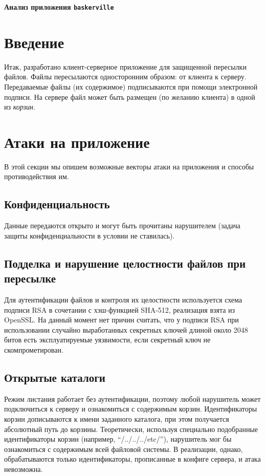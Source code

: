 \documentclass[a4paper,12pt]{article}
\begin{document}
\large
\sffamily
\thispagestyle{fancy}

\begin{center}\LARGE\renewcommand{\baselinestretch}{.9}
\textbf{Анализ приложения {\tt baskerville}}\\
\end{center}

\section*{Введение}

Итак, разработано клиент-серверное приложение для защищенной пересылки файлов.
Файлы пересылаются односторонним образом: от клиента к серверу. Передаваемые файлы (их содержимое)
подписываются при помощи электронной подписи.
На сервере файл может быть размещен (по желанию клиента) в одной из \emph{корзин}.

\section{Атаки на приложение}

В этой секции мы опишем возможные векторы атаки на приложения и способы противодействия им.

\subsection{Конфиденциальность}

Данные передаются открыто и могут быть прочитаны нарушителем (задача защиты конфиденциальности в условии не ставилась).

\subsection{Подделка и нарушение целостности файлов при пересылке}

Для аутентификации файлов и контроля их целостности используется схема подписи RSA в сочетании с хэш-функцией SHA-512, реализация взята 
из OpenSSL. На данный момент нет причин считать, что у подписи RSA при использовании случайно выработанных секретных ключей длиной около 2048 битов
есть эксплуатируемые уязвимости, если секретный ключ не скомпрометирован.

\subsection{Открытые каталоги}

Режим листания работает без аутентификации, поэтому любой нарушитель может подключиться к серверу и ознакомиться с содержимым корзин.
Идентификаторы корзин дописываются к имени заданного каталога, при этом получается абсолютный путь до корзины. 
Теоретически, используя специально подобранные идентификаторы корзин (например, ``/../../../etc/''), нарушитель мог бы ознакомиться с содержимым всей файловой системы. В реализации, однако, обрабатываются только идентификаторы, прописанные в конфиге сервера, и атака невозможна.
\end{document}
